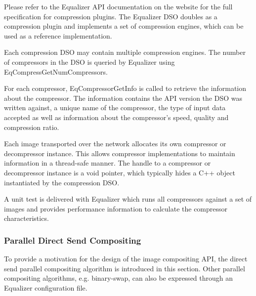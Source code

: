 \documentclass[10pt,a4]{scrartcl}
\begin{document}
Please refer to the Equalizer API documentation on the website for the
full specification for compression plugins. The Equalizer DSO doubles as
a compression plugin and implements a set of compression engines, which
can be used as a reference implementation.

Each compression DSO may contain multiple compression engines. The
number of compressors in the DSO is queried by Equalizer using
\textsf{EqCompressGetNumCompressors}. 

For each compressor, \textsf{EqCompressorGetInfo} is called to retrieve
the information about the compressor. The information contains the API
version the DSO was written against, a unique name of the compressor,
the type of input data accepted as well as information about the
compressor's speed, quality and compression ratio.

Each image transported over the network allocates its own compressor or
decompressor instance. This allows compressor implementations to
maintain information in a thread-safe manner. The handle to a compressor
or decompressor instance is a void pointer, which typically hides a C++
object instantiated by the compression DSO.

A unit test is delivered with Equalizer which runs all compressors
against a set of images and provides performance information to
calculate the compressor characteristics.



\subsubsection{\label{sDirectSend}Parallel Direct Send Compositing}

To provide a motivation for the design of the image compositing
API, the direct send parallel compositing algorithm is introduced in this
section. Other parallel compositing algorithms, e.g. binary-swap, can
also be expressed through an Equalizer configuration file.
\end{document}
